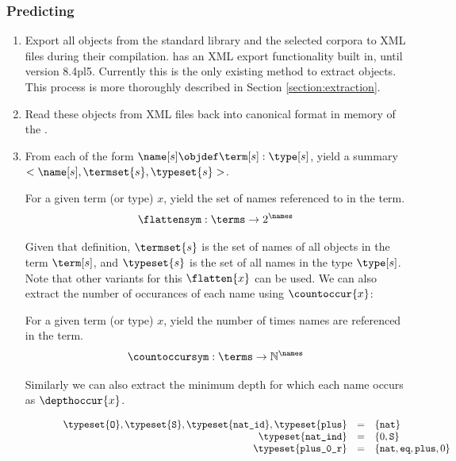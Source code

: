 \subsubsection{Predicting}
\begin{enumerate}
	\item Export all \coq objects from the standard library and the selected corpora to XML files during their compilation.
		\coq has an XML export functionality built in, until version 8.4pl5.
		Currently this is the only existing method to extract \coq objects.
		This process is more thoroughly described in Section \ref{section:extraction}.
	\item Read these objects from XML files back into canonical \acic{} format in memory of the \preloader.
	\item From each \coqobj[s] of the form $\name[s] \objdef \term[s] : \type[s]$,
		yield a summary $<\name[s], \termset{s}, \typeset{s}>$.
		\begin{definition}[$\flatten{x}$]
			For a given term (or type) $x$, yield the set of names referenced to in the term.
			\[ \flattensym : \terms \rightarrow 2^{\names} \]
		\end{definition}
		Given that definition, $\termset{s}$ is the set of names of all objects in the term $\term[s]$,
		and $\typeset{s}$ is the set of all names in the type $\type[s]$.
		Note that other variants for this $\flatten{x}$ can be used.
    We can also extract the number of occurances of each name using $\countoccur{x}$:
    \begin{definition}[$\countoccur{x}$]
			For a given term (or type) $x$, yield the number of times names are referenced in the term.
      \[ \countoccursym : \terms \rightarrow \mathbb{N}^{\names} \]
    \end{definition}
    Similarly we can also extract the minimum depth for which each name occurs as $\depthoccur{x}$.
		\begin{figure}[H]
			\[
				\begin{array}{rcl}
					\typeset{\texttt{O}}, \typeset{\texttt{S}}, \typeset{\texttt{nat\_id}}, \typeset{\texttt{plus}} & = & \{ \texttt{nat} \}\\
					\typeset{\texttt{nat\_ind}} & = & \{ 0, \texttt{S} \} \\
					\typeset{\texttt{plus\_0\_r}} & = & \{ \texttt{nat}, \texttt{eq}, \texttt{plus}, 0 \} \\
					& & \\

\end{array}\]
\end{figure}
\end{enumerate}
